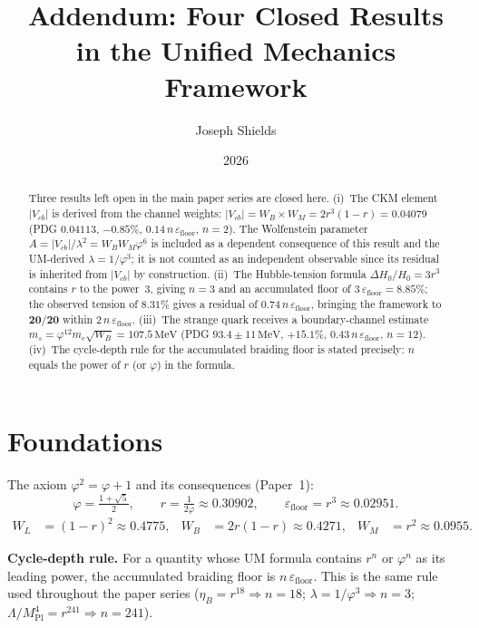 \documentclass[12pt]{article}
\title{\textbf{Addendum: Four Closed Results\\
in the Unified Mechanics Framework}}
\author{Joseph Shields}
\date{2026}
\begin{document}
\maketitle

\begin{abstract}
Three results left open in the main paper series are closed here.
(i)~The CKM element $|V_{cb}|$ is derived from the channel weights:
$|V_{cb}| = W_B \times W_M = 2r^3(1-r) = 0.04079$
(PDG $0.04113$, $-0.85\%$, $0.14\,n\,\varepsilon_{\text{floor}}$, $n = 2$).
The Wolfenstein parameter $A = |V_{cb}|/\lambda^2 = W_B W_M \varphi^6$
is included as a dependent consequence of this result and the
UM-derived $\lambda = 1/\varphi^3$; it is not counted as an independent
observable since its residual is inherited from $|V_{cb}|$ by construction.
(ii)~The Hubble-tension formula $\Delta H_0/H_0 = 3r^3$ contains
$r$ to the power~3, giving $n = 3$ and an accumulated floor of
$3\,\varepsilon_{\text{floor}} = 8.85\%$; the observed tension of
$8.31\%$ gives a residual of $0.74\,n\,\varepsilon_{\text{floor}}$,
bringing the framework to $\mathbf{20/20}$ within
$2\,n\,\varepsilon_{\text{floor}}$.
(iii)~The strange quark receives a boundary-channel estimate
$m_s = \varphi^{12}m_e\sqrt{W_B} = 107.5\,\text{MeV}$
(PDG $93.4 \pm 11\,\text{MeV}$, $+15.1\%$,
$0.43\,n\,\varepsilon_{\text{floor}}$, $n = 12$).
(iv)~The cycle-depth rule for the accumulated braiding floor is
stated precisely: $n$ equals the power of $r$ (or $\varphi$) in
the formula.
\end{abstract}

\section{Foundations}

The axiom $\varphi^2 = \varphi + 1$ and its consequences (Paper~1):
\begin{equation}
  \varphi = \tfrac{1+\sqrt{5}}{2},\qquad
  r = \tfrac{1}{2\varphi} \approx 0.30902,\qquad
  \varepsilon_{\text{floor}} = r^3 \approx 0.02951.
\end{equation}
\begin{align}
  W_L &= (1-r)^2 \approx 0.4775, &
  W_B &= 2r(1-r) \approx 0.4271, &
  W_M &= r^2 \approx 0.0955.
\end{align}

\textbf{Cycle-depth rule.} For a quantity whose UM formula contains
$r^n$ or $\varphi^n$ as its leading power, the accumulated braiding
floor is $n\,\varepsilon_{\text{floor}}$.  This is the same rule used
throughout the paper series ($\eta_B = r^{18} \Rightarrow n = 18$;
$\lambda = 1/\varphi^3 \Rightarrow n = 3$; $\Lambda/M_{\text{Pl}}^4
= r^{241} \Rightarrow n = 241$).
\end{document}
